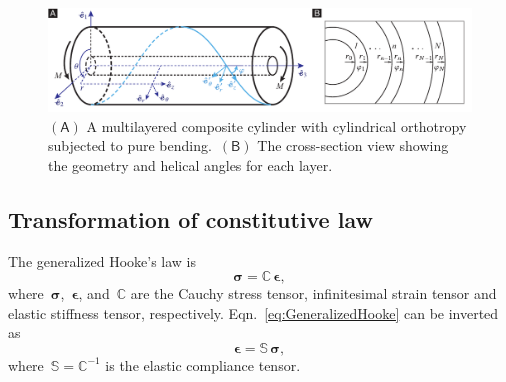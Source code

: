 \documentclass[preprint,10pt,times]{elsarticle}
\numberwithin{equation}{section}
\renewcommand{\u}[1]{\boldsymbol{#1}}
\newcommand{\pr}[1]{\left( #1 \right)}
\newcommand{\subf}[1]{\pr{\textsf{#1}}}
\renewcommand{\>}{$\Rightarrow$}
\begin{document}
\begin{figure}[t]
	\centering
	\graphicspath{{./figure/}}
	\includegraphics[width=1\textwidth]{schematic.pdf}
	\caption{$\subf{A}$ A multilayered composite cylinder with cylindrical orthotropy subjected to pure bending.~$\subf{B}$ The cross-section view showing the geometry and helical angles for each layer.}
	\label{fig:schematic}
\end{figure}

\subsection{Transformation of constitutive law}
\label{sec:MatrixTrans}
The generalized Hooke's law is
\begin{equation}
\u{\sigma} = \mathbb{C}\, \u{\epsilon},
\label{eq:GeneralizedHooke}
\end{equation}
where~$\u{\sigma}$,~$\u{\epsilon}$, and~$\mathbb{C}$ are the Cauchy stress tensor, infinitesimal strain tensor and elastic stiffness tensor, respectively. Eqn.~\eqref{eq:GeneralizedHooke} can be inverted as
\begin{equation}
 \u{\epsilon} = \mathbb{S}\, \u{\sigma},
\label{eq:GeneralizedHookeInverse}
\end{equation}
where~$\mathbb{S} = \mathbb{C}^{-1}$ is the elastic compliance tensor.
\end{document}
